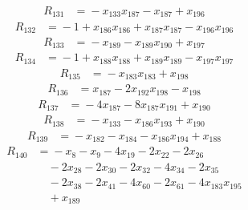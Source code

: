 \begin{align*}
R_{131}&={}-x_{133}x_{187} -x_{187} +x_{196}
\end{align*}
\begin{align*}
R_{132}&={}-1 +x_{186}x_{186} +x_{187}x_{187} -x_{196}x_{196}
\end{align*}
\begin{align*}
R_{133}&={}-x_{189} -x_{189}x_{190} +x_{197}
\end{align*}
\begin{align*}
R_{134}&={}-1 +x_{188}x_{188} +x_{189}x_{189} -x_{197}x_{197}
\end{align*}
\begin{align*}
R_{135}&={}-x_{183}x_{183} +x_{198}
\end{align*}
\begin{align*}
R_{136}&={}x_{187} -2x_{192}x_{198} -x_{198}
\end{align*}
\begin{align*}
R_{137}&={}-4x_{187} -8x_{187}x_{191} +x_{190}
\end{align*}
\begin{align*}
R_{138}&={}-x_{133} -x_{186}x_{193} +x_{190}
\end{align*}
\begin{align*}
R_{139}&={}-x_{182} -x_{184} -x_{186}x_{194} +x_{188}
\end{align*}
\begin{align*}
R_{140}&={}-x_{8} -x_{9} -4x_{19} -2x_{22} -2x_{26}\\
&\quad{}-2x_{28} -2x_{30} -2x_{32} -4x_{34} -2x_{35}\\
&\quad{}-2x_{38} -2x_{41} -4x_{60} -2x_{61} -4x_{183}x_{195}\\
&\quad{}+x_{189}
\end{align*}
